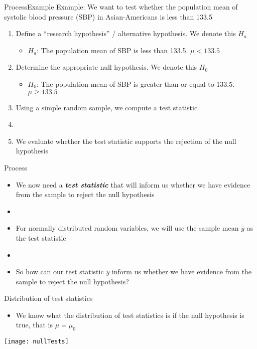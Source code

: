 \documentclass[xcolor=dvipsnames]{beamer}
\begin{document}
\begin{frame}{Process}{Example}
Example: We want to test whether the population mean of systolic blood pressure (SBP) in Asian-Americans is less than 133.5\\
\vspace{10 pt}
	\begin{enumerate}
		\item Define a ``research hypothesis'' / alternative hypothesis. We denote this $H_a$  \pause
		\begin{itemize}
			\item $H_a$: The population mean of SBP is less than 133.5. $\mu < 133.5$  \pause
		\end{itemize}
		\item Determine the appropriate null hypothesis. We denote this $H_0$   \pause
		\begin{itemize}
			\item $H_0$: The population mean of SBP is greater than or equal to 133.5. $\mu \geq 133.5$  \pause
		\end{itemize}
		\item Using a simple random sample, we compute a test statistic  \pause
		\item[]
		\item We evaluate whether the test statistic supports the rejection of the null hypothesis
	\end{enumerate}
\end{frame}

\begin{frame}{Process}
	\begin{itemize}
		\item We now need a \textbf{\emph{test statistic}} that will inform us whether we have evidence from the sample to reject the null hypothesis  \pause
		\item[]
		\item For normally distributed random variables, we will use the sample mean $\bar{y}$ as the test statistic  \pause
		\item[] 
		\item So how can our test statistic $\bar{y}$ inform us whether we have evidence from the sample to reject the null hypothesis?
	\end{itemize}
\end{frame}

\begin{frame}{Distribution of test statistics}
	\begin{itemize}
		\item We know what the distribution of test statistics is if the null hypothesis is true, that is $\mu = \mu_0$  \pause
	\end{itemize}
\begin{center}
	\texttt{[image: nullTests]}
\end{center}
\end{frame}
\end{document}
